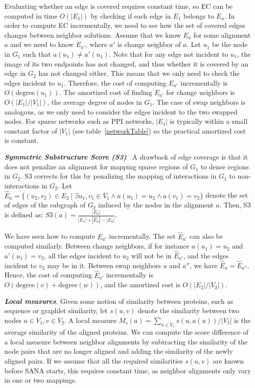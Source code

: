 \documentclass{bioinfo}
\newcommand{\Eb}{\hat{E}}
\begin{document}
\begin{methods}
Evaluating whether an edge is covered requires constant time, so EC can be computed in time $O(|E_1|)$ by checking if each edge in $E_1$ belongs to $E_a$. In order to compute EC incrementally, we need to see how the set of covered edges changes between neighbor solutions. Assume that we know $E_a$ for some alignment $a$ and we need to know $E_{a'}$, where $a'$ is change neighbor of $a$. Let $u_1$ be the node in $G_1$ such that $a(u_1)\not= a'(u_1)$. Note that for any edge not incident to $u_1$, the image of its two endpoints has not changed, and thus whether it is covered by an edge in $G_2$ has not changed either. This means that we only need to check the edges incident to $u_1$. Therefore, the cost of computing $E_{a'}$ incrementally is $O(\mbox{degree}(u_1))$. The amortized cost of finding $E_{a'}$ for change neighbors is $O(|E_1|/|V_1|)$, the average degree of nodes in $G_1$. The case of swap neighbors is analogous, as we only need to consider the edges incident to the two swapped nodes. For sparse networks such as PPI networks, $|E_1|$ is typically within a small constant factor of $|V_1|$ (see table~\ref{networkTable}) so the practical amortized cost is constant.

\emph{\textbf{Symmetric Substructure Score (S3)}}~\citep{MAGNA} A drawback of edge coverage is that it does not penalize an alignment for mapping sparse regions of $G_1$ to dense regions in $G_2$. S3 corrects for this by penalizing the mapping of interactions in $G_1$ to non-interactions in $G_2$. Let $\Eb_a=\{(u_2,v_2)\in E_2 \mid \exists u_1,v_1 \in V_1 \wedge a(u_1)=u_2 \wedge a(v_1)=v_2\}$ denote the set of edges of the subgraph of $G_2$ induced by the nodes in the alignment $a$. Then, S3 is defined as: $S3(a)=\frac{|E_a|}{|E_1|+|\Eb_a|-|E_a|}$.

We have seen how to compute $E_{a'}$ incrementally. The set $\Eb_{a'}$ can also be computed similarly. Between change neighbors, if for instance $a(u_1)=u_2$ and $a'(u_1)=v_2$, all the edges incident to $u_2$ will not be in $\Eb_{a'}$, and the edges incident to $v_2$ may be in it. Between swap neighbors $a$ and $a''$, we have $\Eb_{a}=\Eb_{a''}$. Hence, the cost of computing $\Eb_{a'}$ incrementally is $O(\mbox{degree}(v)+\mbox{degree}(w))$, and the amortized cost is $O(|E_2|/|V_2|)$.

\emph{\textbf{Local measures}}. Given some notion of similarity between proteins, such as sequence or graphlet similarity, let $s(u,v)$ denote the similarity between two nodes $u\in V_1, v\in V_2$. A local measure
$M_s(a)=\sum_{u\in V_1} s(u,a(u))/|V_1|$
is the average similarity of the aligned proteins.
We can compute the score difference of a local measure between neighbor alignments by subtracting the similarity of the node pairs that are no longer aligned and adding the similarity of the newly aligned pairs. If we assume that all the required similarities $s(u,v)$ are known before SANA starts, this requires constant time, as neighbor alignments only vary in one or two mappings.


\end{methods}
\end{document}
